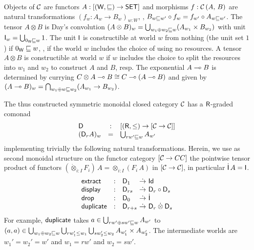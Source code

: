 \documentclass[acmsmall,review,anonymous]{acmart}\settopmatter{printfolios=true,printccs=false,printacmref=false}
\theoremstyle{remark}
\begin{document}
Objects of $\CC$ are functors $A : [(\W,\wleq) \to \SET]$ and morphisms
$f : \Hom A B$ are natural transformations
$(f_w : A_w \to B_w)_{w:W}$, \ie,
$B_{w \wleq w'} \comp f_w = f_{w'} \comp A_{w \wleq w'}$.  The tensor
$A \otimes B$ is Day's convolution
$(A \otimes B)_w = \bigcup_{w_1 \oplus w_2 \wleq w} (A_{w_1} \times B_{w_2})$
with unit $\I_w = \bigcup_{\emp \wleq w} 1$.  The unit $\I$ is
constructible at world $w$ from nothing (the unit set $1$) if $\emp \wleq w$,
\ie, if the world $w$ includes the choice of using no resources.  A
tensor $A \otimes B$ is constructible at world $w$ if $w$ includes the
choice to split the resources into $w_1$ and $w_2$ to construct $A$
and $B$, resp.  The exponential $A \lolli B$ is determined by currying
$C \otimes A \lolli B \cong C \lolli (A \lolli B)$ and given by
$(A \lolli B)_w = \bigcap_{w_1 \oplus w \wleq w_2} (A_{w_1} \to
B_{w_2})$.

The thus constructed symmetric monoidal closed category $\CC$ has a
$\R$-graded comonad
\[
\begin{array}{lcl}
  \D & : & [(\R,\leq) \to [\CC \to \CC]] \\
(\D[r] A)_w & = &
  \bigcup_{rw' \wleq w} A_{w'}
\end{array}
\]
implementing trivially the following natural transformations.
Herein, we use as second monoidal structure
on the functor category $[\CC \to CC]$ the
pointwise tensor product of functors
$(\dot\otimes_{i:I}F_i)\,A = \otimes_{i:I}(F_i\,A)$ in
$[\CC \to \CC]$, in particular $\dot\I\,A = \I$.
\[
\begin{array}{lcl@{~}c@{~}l}
  \textract   & : & \D[1]   & \todot & \Id \\
  \tdisplay & : & \D[rs]  & \todot & \D[r] \comp \D[s] \\
  \tdrop    & : & \D[0]   & \todot & \dot{\I} \\
  \tduplicate  & : & \D[r+s] & \todot & \D[r] \mathbin{\dot\otimes} \D[s] \\
\end{array}
\]
For example, $\tduplicate$ takes
$a \in \bigcup_{rw' \oplus sw' \wleq w} A_{w'}$ to
$(a,a) \in \bigcup_{w_1 \oplus w_2 \wleq w} \bigcup_{rw_1' \leq w_1}
\bigcup_{sw_2' \leq w_2} A_{w'_1} \times A_{w'_2}$.
The intermediate worlds are $w_1' = w_2' = w'$ and $w_1 = rw'$ and $w_2 = sw'$.
\end{document}
